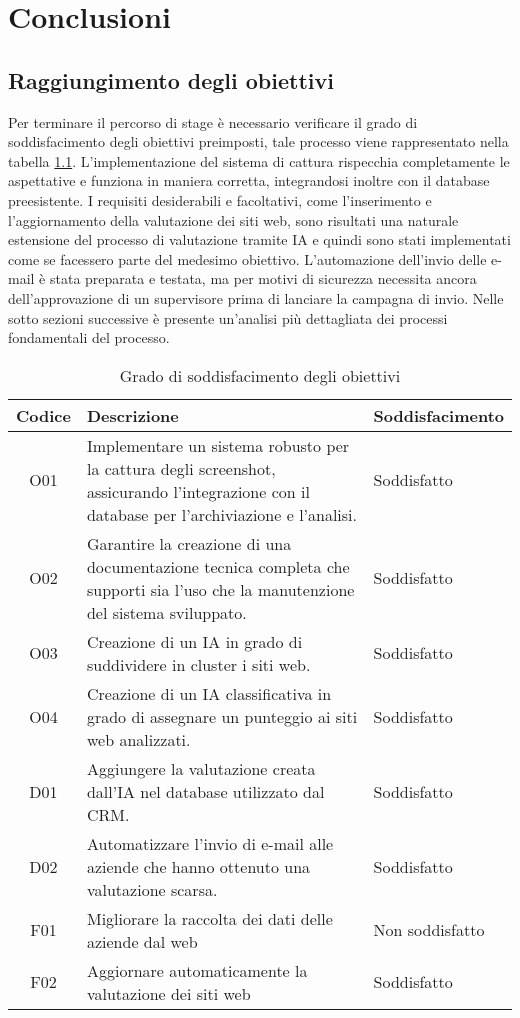 \chapter{Conclusioni}
\label{cap:conclusioni}


\section{Raggiungimento degli obiettivi}
Per terminare il percorso di stage è necessario verificare il grado di soddisfacimento degli obiettivi preimposti, tale processo viene rappresentato nella tabella \ref{soddisfazione}.
L'implementazione del sistema di cattura rispecchia completamente le aspettative e funziona in maniera corretta, integrandosi inoltre con il database preesistente.
I requisiti desiderabili e facoltativi, come l'inserimento e l'aggiornamento della valutazione dei siti web, sono risultati una naturale estensione del processo di valutazione tramite IA e quindi sono stati implementati come se facessero parte del medesimo obiettivo.
L'automazione dell'invio delle e-mail è stata preparata e testata, ma per motivi di sicurezza necessita ancora dell'approvazione di un supervisore prima di lanciare la campagna di invio.
Nelle sotto sezioni successive è presente un'analisi più dettagliata dei processi fondamentali del processo.

\newpage
\begin{table}[!htbp]
    \centering
    \begin{tabularx}{0.8\textwidth}{|c|X|X|}
    \hline
    \textbf{Codice} & \textbf{Descrizione} & \textbf{Soddisfacimento}\\
    \hline
    O01 & Implementare un sistema robusto per la cattura degli screenshot, assicurando l’integrazione con il database per l’archiviazione e l’analisi. & Soddisfatto\\
    \hline
    O02 & Garantire la creazione di una documentazione tecnica completa che supporti sia l’uso che la manutenzione  del sistema sviluppato. & Soddisfatto\\
    \hline
    O03 & Creazione di un IA in grado di suddividere in cluster i siti web. & Soddisfatto\\
    \hline
    O04 & Creazione di un IA classificativa in grado di assegnare un punteggio ai siti web analizzati. & Soddisfatto\\
    \hline
    D01 & Aggiungere la valutazione creata dall'IA nel database utilizzato dal \gls{CRM}. & Soddisfatto\\
    \hline
    D02 & Automatizzare l'invio di e-mail alle aziende che hanno ottenuto una valutazione scarsa. & Soddisfatto\\
    \hline
    F01 & Migliorare la raccolta dei dati delle aziende dal web & Non soddisfatto\\
    \hline
    F02 & Aggiornare automaticamente la valutazione dei siti web & Soddisfatto\\
    \hline
    \end{tabularx}
    \caption{Grado di soddisfacimento degli obiettivi}
    \label{soddisfazione}
\end{table}


